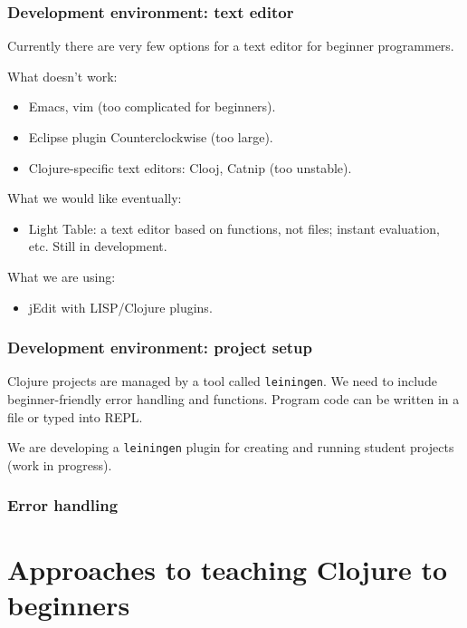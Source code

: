 \documentclass{beamer}
\newcommand{\allcomments}[1]{{#1}}
\newcommand{\joecomment}[1]{{\bf \color{JoesGold}{\allcomments{{#1}}}}}
\newcommand{\elenacomment}[1]{{\bf \textcolor{ForestGreen}{\allcomments{{#1}}}}}
\begin{document}
\begin{frame}
\frametitle{Development environment: text editor}
Currently there are very few options for a text editor for beginner programmers. 

What doesn't work:
\begin{itemize}
\item Emacs, vim (too complicated for beginners).
\item Eclipse plugin Counterclockwise (too large).
\item Clojure-specific text editors: Clooj, Catnip (too unstable). 
\end{itemize}
What we would like eventually:
\begin{itemize}
\item Light Table: a text editor based on functions, not files; instant evaluation, etc. Still in development. 
\end{itemize}
What we are using:
\begin{itemize}
\item jEdit with LISP/Clojure plugins. 
\end{itemize}
\end{frame}

\begin{frame}
\frametitle{Development environment: project setup}
Clojure projects are managed by a tool called {\tt leiningen}. We need to include beginner-friendly error handling and functions. Program code can be written in a file or typed into REPL. 

\vspace*{.3in}

We are developing a {\tt leiningen} plugin for creating and running student projects (work in progress).
\end{frame}

\begin{frame}
\frametitle{Error handling}

\end{frame}

\section{Approaches to teaching Clojure to beginners}
\end{document}
